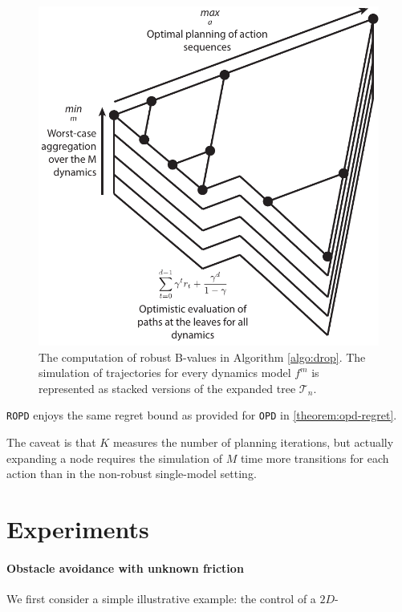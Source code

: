 \documentclass{article}
\begin{document}
\begin{figure}
\centering
\includegraphics[width=0.4\linewidth]{img/robust-control-tree}
\caption{The computation of robust B-values in Algorithm \ref{algo:drop}. The simulation of trajectories for every dynamics model $f^m$ is represented as stacked versions of the expanded tree $\mathcal{T}_n$.}
\label{fig:drop}
\end{figure}

\begin{theorem}
\label{theorem:drop-regret}
\texttt{ROPD} enjoys the same regret bound as provided for \texttt{OPD} in \autoref{theorem:opd-regret}.
\end{theorem}

The caveat is that $K$ measures the number of planning iterations, but actually expanding a node requires the simulation of $M$ time more transitions for each action than in the non-robust single-model setting.

\section{Experiments}


\paragraph{Obstacle avoidance with unknown friction}
We first consider a simple illustrative example: the control of a $2D$-
\end{document}
